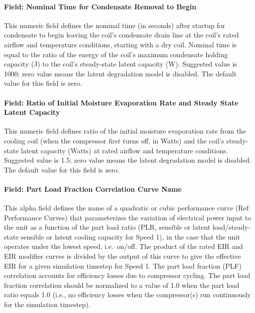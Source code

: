 \paragraph{Field: Nominal Time for Condensate Removal to Begin}\label{field-nominal-time-for-condensate-removal-to-begin-1}

This numeric field defines the nominal time (in seconds) after startup for condensate to begin leaving the coil's condensate drain line at the coil's rated airflow and temperature conditions, starting with a dry coil. Nominal time is equal to the ratio of the energy of the coil's maximum condensate holding capacity (J) to the coil's steady-state latent capacity (W). Suggested value is 1000; zero value means the latent degradation model is disabled. The default value for this field is zero.

\paragraph{Field: Ratio of Initial Moisture Evaporation Rate and Steady State Latent Capacity}\label{field-ratio-of-initial-moisture-evaporation-rate-and-steady-state-latent-capacity-1}

This numeric field defines ratio of the initial moisture evaporation rate from the cooling coil (when the compressor first turns off, in Watts) and the coil's steady-state latent capacity (Watts) at rated airflow and temperature conditions. Suggested value is 1.5; zero value means the latent degradation model is disabled. The default value for this field is zero.

\paragraph{Field: Part Load Fraction Correlation Curve Name}\label{field-part-load-fraction-correlation-curve-name-4}

This alpha field defines the name of a quadratic or cubic performance curve (Ref: Performance Curves) that parameterizes the variation of electrical power input to the unit as a function of the part load ratio (PLR, sensible or latent load/steady-state sensible or latent cooling capacity for Speed 1), in the case that the unit operates under the lowest speed, i.e.~on/off. The product of the rated EIR and EIR modifier curves is divided by the output of this curve to give the effective EIR for a given simulation timestep for Speed 1. The part load fraction (PLF) correlation accounts for efficiency losses due to compressor cycling. The part load fraction correlation should be normalized to a value of 1.0 when the part load ratio equals 1.0 (i.e., no efficiency losses when the compressor(s) run continuously for the simulation timestep).

